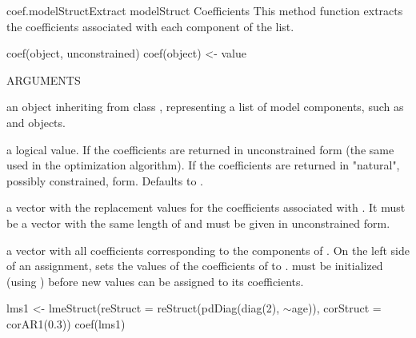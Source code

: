 \documentclass[pdftex]{article} \usepackage{url,graphicx}
\renewcommand{\Twiddle}{\mbox{\(\sim\)}}
\begin{document}
\begin{Helpfile}{coef.modelStruct}{Extract modelStruct Coefficients}
This method function extracts the coefficients associated with each
component of the  list.
\begin{Example}
coef(object, unconstrained)
coef(object) <- value
\end{Example}
\begin{Argument}{ARGUMENTS}
\item[\Co{object:}]
an object inheriting from class ,
representing a list of model components, such as  and
 objects.
\item[\Co{unconstrained:}]
a logical value. If  the coefficients
are returned in unconstrained form (the same used in the optimization
algorithm). If  the coefficients are returned in
"natural", possibly constrained, form. Defaults to .
\item[\Co{value:}]
a vector with the replacement values for the coefficients
associated with . It must be a vector with the same length
of  and must be given in unconstrained form.
\end{Argument}
a vector with all coefficients corresponding to the components of
.
On the left side of an assignment, sets the values of the coefficients
of  to .  must be initialized (using
) before new values can be assigned to its
coefficients.
\need 15pt
\vspace{-16pt} 
\begin{Example}
lms1 <- lmeStruct(reStruct = reStruct(pdDiag(diag(2), \Twiddle age)),
   corStruct = corAR1(0.3))
coef(lms1)
\end{Example}
\end{Helpfile}
\end{document}
